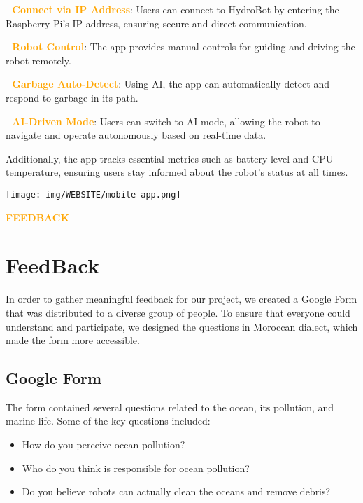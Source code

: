 \vspace{1cm}
\begin{minipage}{0.6\textwidth}
    - \textbf{\textcolor{orange}{Connect via IP Address}}: Users can connect to HydroBot by entering the Raspberry Pi's IP address, ensuring secure and direct communication.

    - \textbf{\textcolor{orange}{Robot Control}}: The app provides manual controls for guiding and driving the robot remotely.

    - \textbf{\textcolor{orange}{Garbage Auto-Detect}}: Using AI, the app can automatically detect and respond to garbage in its path.

    - \textbf{\textcolor{orange}{AI-Driven Mode}}: Users can switch to AI mode, allowing the robot to navigate and operate autonomously based on real-time data.

    Additionally, the app tracks essential metrics such as battery level and CPU temperature, ensuring users stay informed about the robot’s status at all times.
\end{minipage}
\hfill
\begin{minipage}{0.35\textwidth}
    \centering
    \texttt{[image: img/WEBSITE/mobile app.png]}
\end{minipage}


\newpage
\begin{center}
    \huge \textbf{\textcolor{orange}{FEEDBACK}} \\[0.5cm]
 
\end{center}
\section{\large \textbf{FeedBack}}
In order to gather meaningful feedback for our project, we created a Google Form that was distributed to a diverse group of people. To ensure that everyone could understand and participate, we designed the questions in Moroccan dialect, which made the form more accessible.
\subsection{\textbf{Google Form}}


The form contained several questions related to the ocean, its pollution, and marine life. Some of the key questions included:

\begin{itemize}
    \item How do you perceive ocean pollution?
    \item Who do you think is responsible for ocean pollution?
    \item Do you believe robots can actually clean the oceans and remove debris?
\end{itemize}

